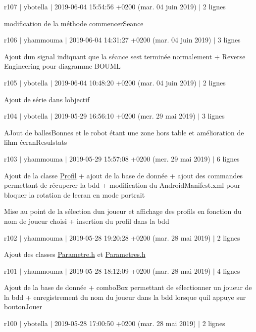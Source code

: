 r107 $\vert$ ybotella $\vert$ 2019-\/06-\/04 15\+:54\+:56 +0200 (mar. 04 juin 2019) $\vert$ 2 lignes

modification de la méthode commencer\+Seance

r106 $\vert$ yhammouma $\vert$ 2019-\/06-\/04 14\+:31\+:27 +0200 (mar. 04 juin 2019) $\vert$ 3 lignes

Ajout d\textquotesingle{}un signal indiquant que la séance s\textquotesingle{}est terminée normalement + Reverse Engineering pour diagramme B\+O\+U\+ML

r105 $\vert$ ybotella $\vert$ 2019-\/06-\/04 10\+:48\+:20 +0200 (mar. 04 juin 2019) $\vert$ 2 lignes

Ajout de série dans l\textquotesingle{}objectif

r104 $\vert$ ybotella $\vert$ 2019-\/05-\/29 16\+:56\+:10 +0200 (mer. 29 mai 2019) $\vert$ 3 lignes

A\+Jout de balles\+Bonnes et le robot étant une zone hors table et amélioration de l\textquotesingle{}ihm écran\+Resulstats

r103 $\vert$ yhammouma $\vert$ 2019-\/05-\/29 15\+:57\+:08 +0200 (mer. 29 mai 2019) $\vert$ 6 lignes

Ajout de la classe \hyperlink{class_profil}{Profil} + ajout de la base de donnée + ajout des commandes permettant de récuperer la bdd + modification du Android\+Manifest.\+xml pour bloquer la rotation de l\textquotesingle{}ecran en mode portrait
\begin{DoxyItemize}
\item Mise au point de la sélection d\textquotesingle{}un joueur et affichage des profils en fonction du nom de joueur choisi + insertion du profil dans la bdd
\end{DoxyItemize}

r102 $\vert$ yhammouma $\vert$ 2019-\/05-\/28 19\+:20\+:28 +0200 (mar. 28 mai 2019) $\vert$ 2 lignes

Ajout des classes \hyperlink{_parametre_8h}{Parametre.\+h} et \hyperlink{_parametres_8h}{Parametres.\+h}

r101 $\vert$ yhammouma $\vert$ 2019-\/05-\/28 18\+:12\+:09 +0200 (mar. 28 mai 2019) $\vert$ 4 lignes

Ajout de la base de donnée + combo\+Box permettant de sélectionner un joueur de la bdd + enregistrement du nom du joueur dans la bdd lorsque qu\textquotesingle{}il appuye sur bouton\+Jouer

r100 $\vert$ ybotella $\vert$ 2019-\/05-\/28 17\+:00\+:50 +0200 (mar. 28 mai 2019) $\vert$ 2 lignes

